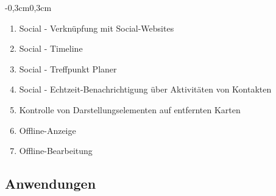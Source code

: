 \begin{table}[H]
\begin{adjustwidth}{-0,3cm}{0,3cm}
{\begin{enumerate}[labelwidth=0pt,leftmargin=39pt,noitemsep,topsep=0pt,parsep=0pt,partopsep=0pt]
\item Social - Verknüpfung mit Social-Websites
\item Social - Timeline
\item Social - Treffpunkt Planer
\item Social - Echtzeit-Benachrichtigung über Aktivitäten von Kontakten
\item Kontrolle von Darstellungselementen auf entfernten Karten
\item Offline-Anzeige
\item Offline-Bearbeitung
\end{enumerate}
}
	\end{adjustwidth}
	\end{table}


\subsection{Anwendungen}\label{3_ANW}

